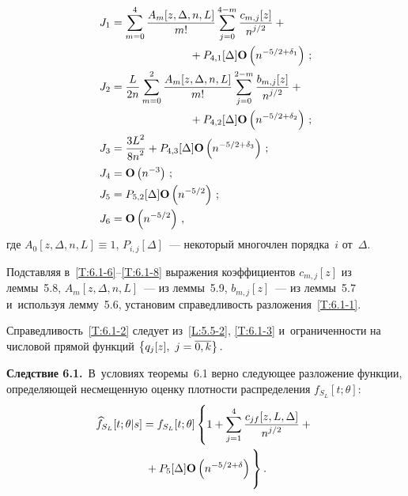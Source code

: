 \begin{multicols}{2}
 \noindent
 \begin{align}
 J_1&=\sum\limits_{m=0}^4  \fr{A_m[z,\Delta,n,L]}{m!} \sum\limits_{j=0}^{4-m}
  \fr{c_{m,j}[z]}{n^{j/2}}+{}\notag\\
  &\hspace*{25mm}{}+P_{4,1}[\Delta]\Op\left(n^{-5/2+\delta_1}\right)\,;
 \label{T:6.1-6}\\
 J_2&=\fr{L}{2n} \sum\limits_{m=0}^2 \fr{A_m[z,\Delta,n,L]}{m!}
 \sum\limits_{j=0}^{2-m} \fr{b_{m,j}[z]}{n^{j/2}}
 +{}\notag\\
 &\hspace*{25mm}{}+P_{4,2}[\Delta]\Op\left(n^{-5/2+\delta_2}\right)\,;
 \label{T:6.1-7}\\
J_3&= \fr{3 L^2}{8n^2}+P_{4,3}[\Delta]\Op\left(n^{-5/2+\delta_3}\right)\,;
 \label{T:6.1-8}\\
J_4&=\Op\left(n^{-3}\right)\,;\notag\\
 J_5&=P_{5,2}[\Delta]\Op\left(n^{-5/2}\right)\,;\notag\\
 J_6&= \Op\left(n^{-5/2}\right)\,,\notag
 \end{align}
 где $A_0[z,\Delta,n,L]\equiv 1$, $P_{i,j}[\Delta]$~--- некоторый многочлен порядка~$i$ от~$\Delta$.

 Подставляя в~\eqref{T:6.1-6}--\eqref{T:6.1-8}  выражения коэффициентов
 $c_{m,j}[z]$ из леммы~5.8,
 $A_m[z,\Delta,n,L]$~--- из леммы~5.9,
 $b_{m,j}[z]$~--- из леммы~5.7 и~используя
 лемму~5.6, установим справедливость разложения~\eqref{T:6.1-1}.

 Справедливость~\eqref{T:6.1-2} следует из~\eqref{L:5.5-2}, \eqref{T:6.1-3}
 и~ограниченности на числовой прямой функций $\left\{q_j[z], \ j\hm=\overline{0,k}\right\}.$

\smallskip

\noindent
\textbf{Следствие 6.1.}\
В~условиях теоремы~6.1 верно следующее разложение функции,
  определяющей несмещенную оценку
 плотности распределения $f_{S_L}[t;\theta]$:
  \begin{multline*}
 \widehat{f}_{S_L}[t;\theta|s]=f_{S_L}[t;\theta]
 \left\{\vphantom{  \sum\limits_{j=1}^4} 1
+  \sum\limits_{j=1}^4 \fr{c_{jf}[z,L,\Delta]}{n^{j/2}}+{}\right.\\
\left.{}+  P_5[\Delta]\Op\left(n^{-5/2+\delta} \right)
\vphantom{  \sum\limits_{j=1}^4}
\right\}.
 \end{multline*}


\end{multicols}
